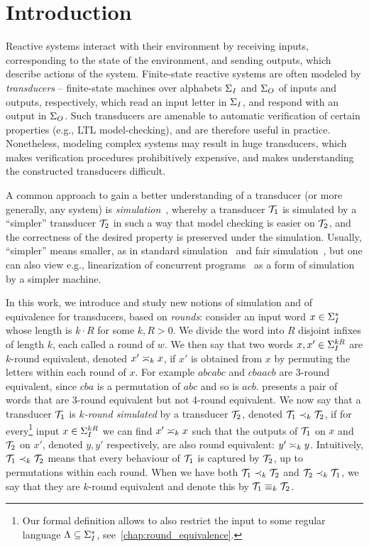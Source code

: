 \chapter{Introduction}
\label{chap:intro}

Reactive systems interact with their environment by receiving inputs, corresponding to the state of the environment, and sending outputs, which describe actions of the system. Finite-state reactive systems are often modeled by \emph{transducers} -- finite-state machines over alphabets $\sI$ and $\sO$ of inputs and outputs, respectively, which read an input letter in $\sI$, and respond with an output in $\sO$. 
Such transducers are amenable to automatic verification of certain properties (e.g., LTL model-checking), and are therefore useful in practice. Nonetheless, modeling complex systems may result in huge transducers, which makes verification procedures prohibitively expensive, and makes understanding the constructed transducers difficult.

A common approach to gain a better understanding of a transducer (or more generally, any system) is \emph{simulation}~\cite{Milner1971}, whereby a transducer $\cT_1$ is simulated by a ``simpler'' transducer $\cT_2$ in such a way that model checking is easier on $\cT_2$, and the correctness of the desired property is preserved under the simulation. Usually, ``simpler'' means smaller, as in standard simulation~\cite{Milner1971} and fair simulation~\cite{Henzinger1997}, but one can also view e.g., linearization of concurrent programs~\cite{Herlihy1987} as a form of simulation by a simpler machine.

In this work, we introduce and study new notions of simulation and of equivalence for transducers, based on \emph{rounds}: consider an input word $x\in \sI^*$ whose length is $k\cdot R$ for some $k,R>0$. We divide the word into $R$ disjoint infixes of length $k$, each called a round of $w$. We then say that two words $x,x'\in \sI^{kR}$ are $k$-round equivalent, denoted $x'\req[k]x$, if $x'$ is obtained from $x$ by permuting the letters within each round of $x$. For example $abcabc$ and $cbaacb$ are $3$-round equivalent, since $cba$ is a permutation of $abc$ and so is $acb$.  presents a pair of words that are 3-round equivalent but not 4-round equivalent. We now say that a transducer $\cT_1$ is \emph{$k$-round simulated} by a transducer $\cT_2$, denoted $\cT_1\prec_{k} \cT_2$, if for every\footnote{Our formal definition allows to also restrict the input to some regular language $\fL\subseteq \sI^*$, see~\cref{chap:round_equivalence}.} input $x\in \sI^{kR}$ we can find $x'\req[k]x$ such that the outputs of $\cT_1$ on $x$ and $\cT_2$ on $x'$, denoted $y,y'$ respectively, are also round equivalent: $y'\req[k] y$.
Intuitively, $\cT_1\prec_{k}\cT_2$ means that every behaviour of $\cT_1$ is captured by $\cT_2$, up to permutations within each round.
When we have both $\cT_1\prec_{k}\cT_2$ and $\cT_2\prec_{k}\cT_1$, we say that they are $k$-round equivalent and denote this by $\cT_1\equiv_{k}\cT_2$.

